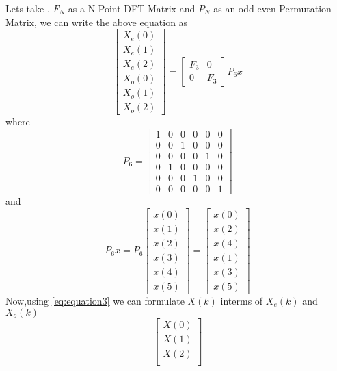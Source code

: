 \documentclass[journal,12pt,twocolumn]{IEEEtran}
\renewcommand\thesection{\arabic{section}}
\begin{document}
\begin{enumerate}[label=\thesection.\arabic*.,ref=\thesection.\theenumi]
Lets take , $F_{N}$ as a N-Point DFT Matrix and $P_{N}$ as an odd-even Permutation Matrix, we can write the above equation as
\begin{equation}
\begin{bmatrix}
X_{e}(0) \\ 
X_{e}(1) \\ 
X_{e}(2) \\ 
X_{o}(0) \\ 
X_{o}(1) \\ 
X_{o}(2)
\end{bmatrix}
=
\begin{bmatrix}
F_{3} & 0 \\
0 & F_{3}
\end{bmatrix}
P_{6}
x   
\label{eq:equation6}
\end{equation}
where
\begin{equation}
P_{6} 
=
\begin{bmatrix}
1 & 0 & 0 & 0 & 0 & 0\\
0 & 0 & 1 & 0 & 0 & 0\\
0 & 0 & 0 & 0 & 1 & 0\\
0 & 1 & 0 & 0 & 0 & 0\\
0 & 0 & 0 & 1 & 0 & 0\\
0 & 0 & 0 & 0 & 0 & 1
\end{bmatrix} 
\end{equation}
and 
\begin{equation}
P_{6}x
=
P_{6}
\begin{bmatrix}
x(0) \\ 
x(1) \\ 
x(2) \\ 
x(3) \\ 
x(4) \\ 
x(5) 
\end{bmatrix}
=
\begin{bmatrix}
x(0) \\ 
x(2) \\ 
x(4) \\ 
x(1) \\ 
x(3) \\ 
x(5) 
\end{bmatrix}   
\end{equation}
Now,using \eqref{eq:equation3} we can formulate  $X(k)$ interms of $X_{e}(k)$ and $X_{o}(k)$
\begin{equation}
\begin{bmatrix}
X(0) \\ 
X(1) \\ 
X(2) \\ 

\end{bmatrix}
\end{equation}
\end{enumerate}
\end{document}
